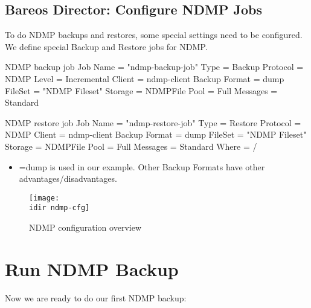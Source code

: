\subsection{Bareos Director: Configure NDMP Jobs}

To do NDMP backups and restores, some special settings need to be configured. We define special Backup and Restore jobs for NDMP.

\begin{bconfig}{NDMP backup job}
Job {
  Name          = "ndmp-backup-job"
  Type          = Backup
  Protocol      = NDMP
  Level         = Incremental
  Client        = ndmp-client
  Backup Format = dump
  FileSet       = "NDMP Fileset"
  Storage       = NDMPFile
  Pool          = Full
  Messages      = Standard
}
\end{bconfig}

\begin{bconfig}{NDMP restore job}
Job {
  Name          = "ndmp-restore-job"
  Type          = Restore
  Protocol      = NDMP
  Client        = ndmp-client
  Backup Format = dump
  FileSet       = "NDMP Fileset"
  Storage       = NDMPFile
  Pool          = Full
  Messages      = Standard
  Where         = /
}
\end{bconfig}

\begin{itemize}
    \item {}=dump is used in our example. Other Backup Formats have other advantages/disadvantages.
\end{itemize}


\begin{figure}[htbp]
\centering
\texttt{[image: \\idir ndmp-cfg]}
\caption{NDMP configuration overview}
\label{fig:ndmp-overview}
\end{figure}%


\section{Run NDMP Backup}

Now we are ready to do our first NDMP backup:

